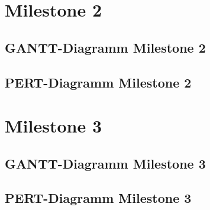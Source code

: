 \section{Milestone 2}
\subsection{GANTT-Diagramm Milestone 2}



\subsection{PERT-Diagramm Milestone 2}



\section{Milestone 3}
\subsection{GANTT-Diagramm Milestone 3}



\subsection{PERT-Diagramm Milestone 3}